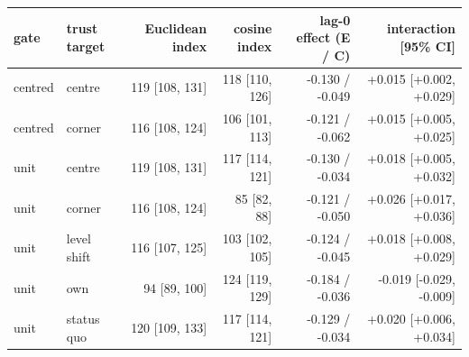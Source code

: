 \begin{tabular}{llrrrr}
\toprule
gate & trust target & Euclidean index & cosine index & lag-0 effect (E / C) & interaction [95\% CI] \\
\midrule
centred & centre & 119 [108, 131] & 118 [110, 126] & -0.130 / -0.049 & +0.015 [+0.002, +0.029] \\
centred & corner & 116 [108, 124] & 106 [101, 113] & -0.121 / -0.062 & +0.015 [+0.005, +0.025] \\
unit & centre & 119 [108, 131] & 117 [114, 121] & -0.130 / -0.034 & +0.018 [+0.005, +0.032] \\
unit & corner & 116 [108, 124] & 85 [82, 88] & -0.121 / -0.050 & +0.026 [+0.017, +0.036] \\
unit & level shift & 116 [107, 125] & 103 [102, 105] & -0.124 / -0.045 & +0.018 [+0.008, +0.029] \\
unit & own & 94 [89, 100] & 124 [119, 129] & -0.184 / -0.036 & -0.019 [-0.029, -0.009] \\
unit & status quo & 120 [109, 133] & 117 [114, 121] & -0.129 / -0.034 & +0.020 [+0.006, +0.034] \\
\bottomrule
\end{tabular}
